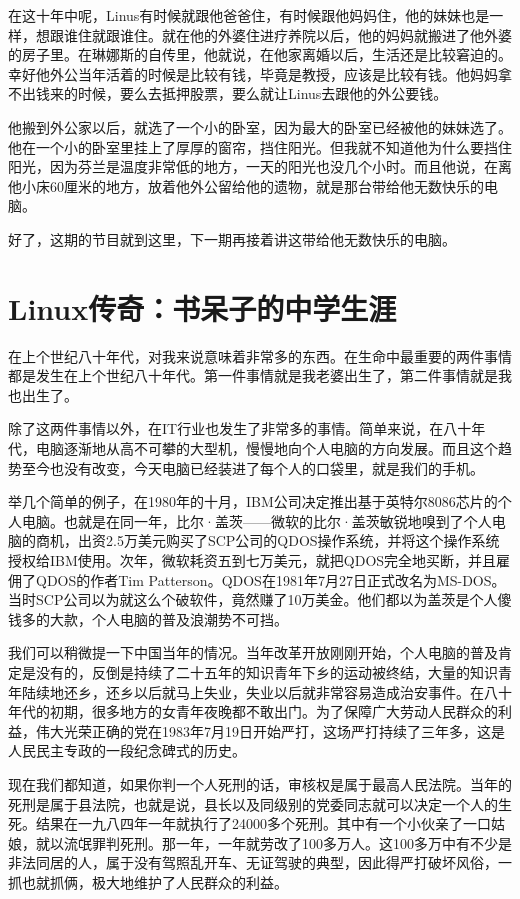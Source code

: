 \documentclass[
  letterpaper,
  DIV=11,
  numbers=noendperiod]{scrreprt}
\begin{document}
在这十年中呢，Linus有时候就跟他爸爸住，有时候跟他妈妈住，他的妹妹也是一样，想跟谁住就跟谁住。就在他的外婆住进疗养院以后，他的妈妈就搬进了他外婆的房子里。在琳娜斯的自传里，他就说，在他家离婚以后，生活还是比较窘迫的。幸好他外公当年活着的时候是比较有钱，毕竟是教授，应该是比较有钱。他妈妈拿不出钱来的时候，要么去抵押股票，要么就让Linus去跟他的外公要钱。

他搬到外公家以后，就选了一个小的卧室，因为最大的卧室已经被他的妹妹选了。他在一个小的卧室里挂上了厚厚的窗帘，挡住阳光。但我就不知道他为什么要挡住阳光，因为芬兰是温度非常低的地方，一天的阳光也没几个小时。而且他说，在离他小床60厘米的地方，放着他外公留给他的遗物，就是那台带给他无数快乐的电脑。

好了，这期的节目就到这里，下一期再接着讲这带给他无数快乐的电脑。


\chapter{Linux传奇：书呆子的中学生涯}\label{linuxux4f20ux5947ux4e66ux5446ux5b50ux7684ux4e2dux5b66ux751fux6daf}

在上个世纪八十年代，对我来说意味着非常多的东西。在生命中最重要的两件事情都是发生在上个世纪八十年代。第一件事情就是我老婆出生了，第二件事情就是我也出生了。

除了这两件事情以外，在IT行业也发生了非常多的事情。简单来说，在八十年代，电脑逐渐地从高不可攀的大型机，慢慢地向个人电脑的方向发展。而且这个趋势至今也没有改变，今天电脑已经装进了每个人的口袋里，就是我们的手机。

举几个简单的例子，在1980年的十月，IBM公司决定推出基于英特尔8086芯片的个人电脑。也就是在同一年，比尔·盖茨------微软的比尔·盖茨敏锐地嗅到了个人电脑的商机，出资2.5万美元购买了SCP公司的QDOS操作系统，并将这个操作系统授权给IBM使用。次年，微软耗资五到七万美元，就把QDOS完全地买断，并且雇佣了QDOS的作者Tim
Patterson。QDOS在1981年7月27日正式改名为MS-DOS。当时SCP公司以为就这么个破软件，竟然赚了10万美金。他们都以为盖茨是个人傻钱多的大款，个人电脑的普及浪潮势不可挡。

我们可以稍微提一下中国当年的情况。当年改革开放刚刚开始，个人电脑的普及肯定是没有的，反倒是持续了二十五年的知识青年下乡的运动被终结，大量的知识青年陆续地还乡，还乡以后就马上失业，失业以后就非常容易造成治安事件。在八十年代的初期，很多地方的女青年夜晚都不敢出门。为了保障广大劳动人民群众的利益，伟大光荣正确的党在1983年7月19日开始严打，这场严打持续了三年多，这是人民民主专政的一段纪念碑式的历史。

现在我们都知道，如果你判一个人死刑的话，审核权是属于最高人民法院。当年的死刑是属于县法院，也就是说，县长以及同级别的党委同志就可以决定一个人的生死。结果在一九八四年一年就执行了24000多个死刑。其中有一个小伙亲了一口姑娘，就以流氓罪判死刑。那一年，一年就劳改了100多万人。这100多万中有不少是非法同居的人，属于没有驾照乱开车、无证驾驶的典型，因此得严打破坏风俗，一抓也就抓俩，极大地维护了人民群众的利益。
\end{document}
